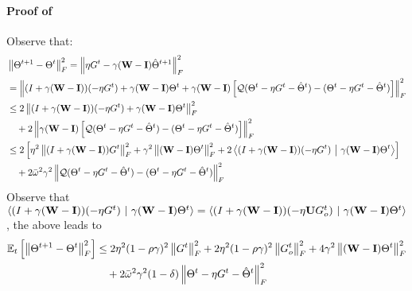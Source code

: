 \documentclass[10pt]{article} %
\theoremstyle{plain}
\theoremstyle{definition}
\theoremstyle{remark}
\newcommand{\Prm}{\Theta}
\newcommand{\bw}{\bar{\omega}}
\newcommand{\avgTheta}{\bar{\Prm}}
\newcommand{\dotp}[2]{\left\langle{#1}\ \middle|\ {#2}\right\rangle}
\newcommand{\norm}[1]{\left\| #1 \right\|}
\newcommand{\nl}{\nonumber\\}
\newcommand{\W}{{\bf W}}
\newcommand{\U}{{\bf U}}
\newcommand{\I}{{\bf I}}
\begin{document}
\paragraph{Proof of }
    Observe that:
\begin{align}
    & \norm{\Theta^{t+1} - \Theta^t}_F^2 = \norm{ \eta G^t - \gamma(\W-\I) \hat{\Theta}^{t+1} }_F^2 \nonumber \\
    & = \norm{(I + \gamma (\W-\I)) (- \eta G^t) + \gamma(\W-\I)\Theta ^t + \gamma(\W-\I) \left[ {\cal Q}(\Theta^t - \eta G^t - \hat{\Theta}^t ) - (\Theta^t - \eta G^t-\hat{\Theta}^t)\right]}_F^2 \nonumber \\
    & \leq 2\norm{( I + \gamma(\W-\I) ) (- \eta G^t) + \gamma(\W-\I)\Theta^t}_F^2 \nonumber \\
    & \quad + 2\norm{\gamma(\W-\I)\left[ {\cal Q}(\Theta^t - \eta G^t - \hat{\Theta}^t ) - (\Theta^t - \eta G^t-\hat{\Theta}^t)\right]}_F^2 \nl 
    & \leq 2 \left[ \eta^2 \norm{ (I+\gamma(\W-\I)) G^t }_F^2 + \gamma^2 \norm{ (\W-\I) \Theta^t }_F^2 + 2 \dotp{( I + \gamma(\W-\I) ) (- \eta G^t)}{\gamma(\W-\I)\Theta^t}\right] \nl 
    & \quad + 2 \bw^2 \gamma^2 \norm{ {\cal Q}(\Theta^t - \eta G^t - \hat{\Theta}^t ) - (\Theta^t - \eta G^t-\hat{\Theta}^t) }_F^2
\end{align}
Observe that $\dotp{( I + \gamma(\W-\I) ) (- \eta G^t)}{\gamma(\W-\I)\Theta^t} = \dotp{( I + \gamma(\W-\I) ) (- \eta \U G_o^t)}{\gamma(\W-\I)\Theta^t}$,
the above leads to
\begin{align}
    \mathbb{E}_t \left[ \norm{\Theta^{t+1} - \Theta^t}_F^2 \right] & \leq 2\eta^2(1-\rho\gamma)^2\norm{G^t}_F^2 + 2\eta^2(1-\rho\gamma)^2\norm{G_o^t}_F^2 + 4\gamma^2\norm{(\W-\I)\Theta^t}_F^2 \nl 
    & \quad + 2 \bw^2 \gamma^2(1-\delta)\norm{\Theta^t - \eta G^t - \hat{\Theta}^t}_F^2 \label{int:Theta_diff_a_2}
\end{align}
\end{document}
